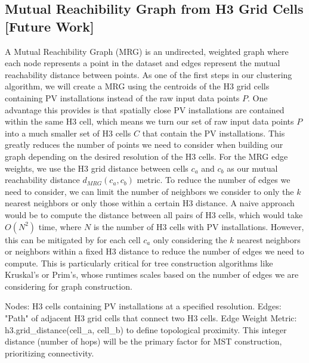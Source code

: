 \begin{multicols}{2}
\subsection{Mutual Reachibility Graph from H3 Grid Cells [Future Work]}
A Mutual Reachibility Graph (MRG) is an undirected, weighted graph where each node represents a point in the dataset and edges represent the mutual reachability distance between points.
As one of the first steps in our clustering algorithm, we will create a MRG using the centroids of the H3 grid cells containing PV installations instead of the raw input data points $P$.
One advantage this provides is that spatially close PV installations are contained within the same H3 cell, which means we turn our set of raw input data points $P$ into a much smaller set of H3 cells $C$ that contain the PV installations.
This greatly reduces the number of points we need to consider when building our graph depending on the desired resolution of the H3 cells.
For the MRG edge weights, we use the H3 grid distance between cells $c_a$ and $c_b$ as our mutual reachability distance $d_{MRG}(c_a, c_b)$ metric. 
To reduce the number of edges we need to consider, we can limit the number of neighbors we consider  to only the $k$ nearest neighbors or only those within a certain H3 distance. 
A naive approach would be to compute the distance between all pairs of H3 cells, which would take $O(N^2)$ time, where $N$ is the number of H3 cells with PV installations.
However, this can be mitigated by for each cell $c_a$ only considering the $k$ nearest neighbors or neighbors within a fixed H3 distance to reduce the number of edges we need to compute. 
This is particularly critical for tree construction algorithms like Kruskal's or Prim's, whose runtimes scales based on the number of edges we are considering for graph construction.

Nodes: H3 cells containing PV installations at a specified resolution.
Edges: "Path" of adjacent H3 grid cells that connect two H3 cells.
Edge Weight Metric: h3.grid\_distance(cell\_a, cell\_b) to define topological proximity. 
This integer distance (number of hops) will be the primary factor for MST construction, prioritizing connectivity.


\end{multicols}
